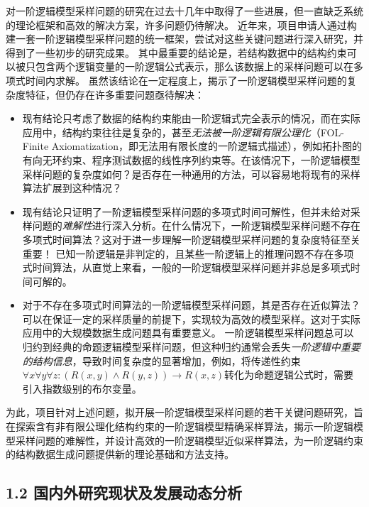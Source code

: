 \documentclass[12pt,UTF8,AutoFakeBold=3,a4paper]{ctexart} %
\begin{document}
对一阶逻辑模型采样问题的研究在过去十几年中取得了一些进展，但一直缺乏系统的理论框架和高效的解决方案，许多问题仍待解决。
近年来，项目申请人通过构建一套一阶逻辑模型采样问题的统一框架，尝试对这些关键问题进行深入研究，并得到了一些初步的研究成果。
其中最重要的结论是，若结构数据中的结构约束可以被只包含两个逻辑变量的一阶逻辑公式表示，那么该数据上的采样问题可以在多项式时间内求解。
虽然该结论在一定程度上，揭示了一阶逻辑模型采样问题的复杂度特征，但仍存在许多重要问题亟待解决：
\begin{itemize}
  \item 现有结论只考虑了数据的结构约束能由一阶逻辑式完全表示的情况，而在实际应用中，结构约束往往是复杂的，甚至\emph{无法被一阶逻辑有限公理化}（FOL-Finite Axiomatization，即无法用有限长度的一阶逻辑式描述），例如拓扑图的有向无环约束、程序测试数据的线性序列约束等。在该情况下，一阶逻辑模型采样问题的复杂度如何？是否存在一种通用的方法，可以容易地将现有的采样算法扩展到这种情况？
  \item 现有结论只证明了一阶逻辑模型采样问题的多项式时间可解性，但并未给对采样问题的\emph{难解性}进行深入分析。在什么情况下，一阶逻辑模型采样问题不存在多项式时间算法？这对于进一步理解一阶逻辑模型采样问题的复杂度特征至关重要！
  已知一阶逻辑是非判定的，且某些一阶逻辑上的推理问题不存在多项式时间算法，从直觉上来看，一般的一阶逻辑模型采样问题并非总是多项式时间可解的。
  \item 对于不存在多项式时间算法的一阶逻辑模型采样问题，其是否存在近似算法？可以在保证一定的采样质量的前提下，实现较为高效的模型采样。这对于实际应用中的大规模数据生成问题具有重要意义。
  一阶逻辑模型采样问题总可以归约到经典的命题逻辑模型采样问题，但这种归约通常会丢失\emph{一阶逻辑中重要的结构信息}，导致时间复杂度的显著增加，例如，将传递性约束$\forall x\forall y\forall z: (R(x,y)\land R(y,z))\rightarrow R(x,z)$转化为命题逻辑公式时，需要引入指数级别的布尔变量。
\end{itemize}

为此，项目针对上述问题，拟开展一阶逻辑模型采样问题的若干关键问题研究，旨在探索含有非有限公理化结构约束的一阶逻辑模型精确采样算法，揭示一阶逻辑模型采样问题的难解性，并设计高效的一阶逻辑模型近似采样算法，为一阶逻辑约束的结构数据生成问题提供新的理论基础和方法支持。

\subsection{1.2 国内外研究现状及发展动态分析}
\end{document}
